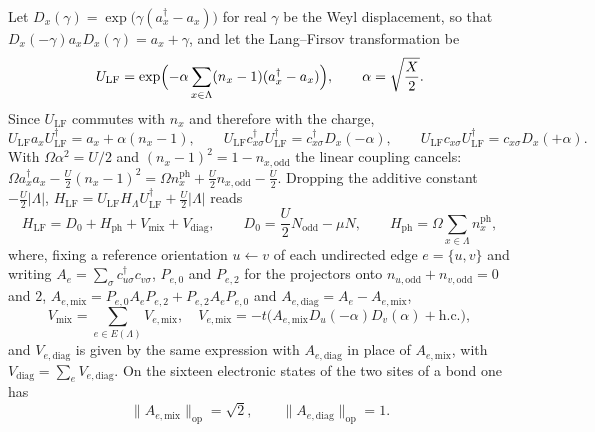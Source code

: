\documentclass[11pt]{article}
\theoremstyle{plain}
\theoremstyle{definition}
\newcommand{\Nodd}{N_{\mathrm{odd}}}
\begin{document}
Let $D_x(\gamma)=\exp\bigl(\gamma(a_x^\dagger-a_x)\bigr)$ for real $\gamma$ be the
Weyl displacement, so that $D_x(-\gamma)a_xD_x(\gamma)=a_x+\gamma$, and let the
Lang--Firsov transformation \cite{hohenadler2007} be
\begin{equation}\label{eq:ulf}
U_{\mathrm{LF}}=\exp\Bigl(-\alpha\sum_{x\in\Lambda}(n_x-1)(a_x^\dagger-a_x)\Bigr),
\qquad \alpha=\sqrt{\frac{X}{2}} .
\end{equation}
Since $U_{\mathrm{LF}}$ commutes with $n_x$ and therefore with the charge,
\begin{equation}\label{eq:lfacts}
U_{\mathrm{LF}}a_xU_{\mathrm{LF}}^\dagger=a_x+\alpha(n_x-1),\qquad
U_{\mathrm{LF}}c^\dagger_{x\sigma}U_{\mathrm{LF}}^\dagger=c^\dagger_{x\sigma}D_x(-\alpha),\qquad
U_{\mathrm{LF}}c_{x\sigma}U_{\mathrm{LF}}^\dagger=c_{x\sigma}D_x(+\alpha).
\end{equation}
With $\Omega\alpha^{2}=U/2$ and $(n_x-1)^{2}=1-n_{x,\mathrm{odd}}$ the linear
coupling cancels:
$\Omega a^\dagger_xa_x-\tfrac{U}{2}(n_x-1)^{2}=\Omega n^{\mathrm{ph}}_x+\tfrac{U}{2}n_{x,\mathrm{odd}}-\tfrac{U}{2}$.
Dropping the additive constant $-\tfrac{U}{2}|\Lambda|$,
$H_{\mathrm{LF}}=U_{\mathrm{LF}}H_\Lambda U_{\mathrm{LF}}^\dagger+\tfrac{U}{2}|\Lambda|$ reads
\begin{equation}\label{eq:HLF}
H_{\mathrm{LF}}=D_0+H_{\mathrm{ph}}+V_{\mathrm{mix}}+V_{\mathrm{diag}},\qquad
D_0=\frac{U}{2}\Nodd-\mu N,\qquad H_{\mathrm{ph}}=\Omega\sum_{x\in\Lambda}n^{\mathrm{ph}}_x ,
\end{equation}
where, fixing a reference orientation $u\leftarrow v$ of each undirected edge
$e=\{u,v\}$ and writing $A_e=\sum_\sigma c^\dagger_{u\sigma}c_{v\sigma}$,
$P_{e,0}$ and $P_{e,2}$ for the projectors onto $n_{u,\mathrm{odd}}+n_{v,\mathrm{odd}}=0$
and $2$, $A_{e,\mathrm{mix}}=P_{e,0}A_eP_{e,2}+P_{e,2}A_eP_{e,0}$ and
$A_{e,\mathrm{diag}}=A_e-A_{e,\mathrm{mix}}$,
\begin{equation}\label{eq:Vmix}
V_{\mathrm{mix}}=\sum_{e\in E(\Lambda)}V_{e,\mathrm{mix}},\quad
V_{e,\mathrm{mix}}=-t\bigl(A_{e,\mathrm{mix}}D_u(-\alpha)D_v(\alpha)+\mathrm{h.c.}\bigr),
\end{equation}
and $V_{e,\mathrm{diag}}$ is given by the same expression with
$A_{e,\mathrm{diag}}$ in place of $A_{e,\mathrm{mix}}$, with
$V_{\mathrm{diag}}=\sum_eV_{e,\mathrm{diag}}$. On the sixteen electronic states of
the two sites of a bond one has
\begin{equation}\label{eq:Anorms}
\|A_{e,\mathrm{mix}}\|_{\mathrm{op}}=\sqrt{2}, \qquad
\|A_{e,\mathrm{diag}}\|_{\mathrm{op}}=1 .
\end{equation}
\end{document}
